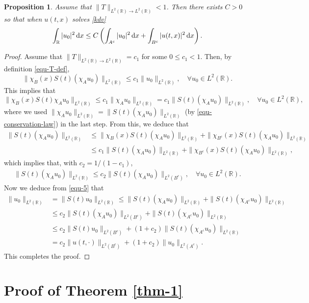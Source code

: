 \documentclass[preprint,12pt]{elsarticle}
\def\R {\mathbb{R}}
\def\d{{\,\rm d}}
\newtheorem{proposition}{Proposition}[section]
\newtheorem{remark}{Remark}[section]
\begin{document}
\begin{proposition}\label{prop-T}
Assume that $\|T\|_{L^2(\R)\to L^2(\R)}< 1$. Then there exists $C>0$ so that when $u(t,x)$ solves  \eqref{kdv}
$$
    \int_\R |u_0|^2\d x \leq C\left( \int_{A^c}|u_0|^2\d x + \int_{B^c}|u(t,x)|^2\d x \right).
$$
\end{proposition}
\begin{proof}
Assume that $\|T\|_{L^2(\R)\to L^2(\R)}=c_1$ for some $0\leq c_1<1$. Then, by definition \eqref{equ-T-def},
$$
\|\chi_B(x)S(t)(\chi_Au_0)\|_{L^2(\R)}\leq c_1\|u_0\|_{L^2(\R)}, \quad \forall u_0\in L^2(\R).
$$
This implies that
 $$
\|\chi_B(x)S(t) \chi_Au_0\|_{L^2(\R)}\leq c_1\|\chi_Au_0\|_{L^2(\R)}=c_1\|S(t) (\chi_Au_0)\|_{L^2(\R)}, \quad \forall u_0\in L^2(\R),
$$
where we used  $\|\chi_Au_0\|_{L^2(\R)}=\|S(t) (\chi_Au_0)\|_{L^2(\R)}$ (by \eqref{equ-conservation-law}) in the last step. From this, we deduce that
\begin{align*}
\|S(t) (\chi_Au_0)\|_{L^2(\R)}&\leq \|\chi_B(x)S(t) (\chi_Au_0)\|_{L^2(\R)}+\|\chi_{B^c}(x)S(t) (\chi_Au_0)\|_{L^2(\R)}\\
&\leq c_1\|S(t) (\chi_Au_0)\|_{L^2(\R)}+\|\chi_{B^c}(x)S(t) (\chi_Au_0)\|_{L^2(\R)},
\end{align*}
which implies that, with  $c_2=1/(1-c_1)$,
\begin{align}\label{equ-5}
 \|S(t) (\chi_Au_0)\|_{L^2(\R)}\leq c_2\|S(t) (\chi_Au_0)\|_{L^2(B^c)}, \quad \forall u_0\in L^2(\R).
\end{align}
Now we deduce from \eqref{equ-5} that
\begin{align*}
\|u_0\|_{L^2(\R)} &= \|S(t)u_0\|_{L^2(\R)}\leq \|S(t) (\chi_Au_0)\|_{L^2(\R)}+\|S(t) (\chi_{A^c}u_0)\|_{L^2(\R)}\\
&\leq c_2\|S(t) (\chi_Au_0)\|_{L^2(B^c)}+\|S(t) (\chi_{A^c}u_0)\|_{L^2(\R)}\\
&\leq c_2\|S(t)u_0\|_{L^2(B^c)}+(1+c_2)\|S(t) (\chi_{A^c}u_0)\|_{L^2(\R)}\\
&=c_2\|u(t,\cdot)\|_{L^2(B^c)}+(1+c_2)\|u_0\|_{L^2(A^c)}.
\end{align*}
This completes the proof.
\end{proof}






\section{Proof of Theorem \ref{thm-1}}
\end{document}
